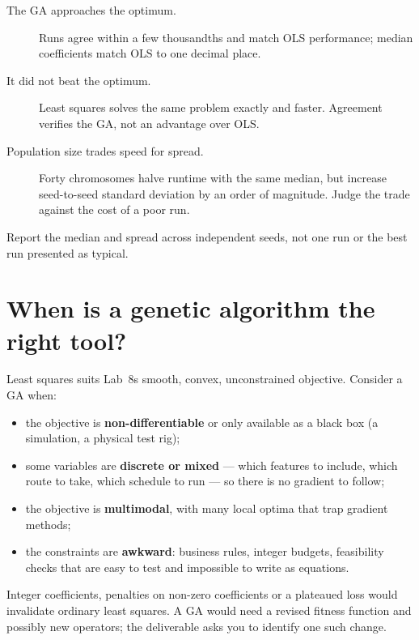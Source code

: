 \begin{description}
  \item[The GA approaches the optimum.] Runs agree within a few thousandths and match OLS performance; median coefficients match OLS to one decimal place.
  \item[It did not beat the optimum.] Least squares solves the same problem exactly and faster. Agreement verifies the GA, not an advantage over OLS.
  \item[Population size trades speed for spread.] Forty chromosomes halve runtime with the same median, but increase seed-to-seed standard deviation by an order of magnitude. Judge the trade against the cost of a poor run.
\end{description}

\begin{pitfall}
Report the median and spread across independent seeds, not one run or the best run presented as typical.
\end{pitfall}

\section{When is a genetic algorithm the right tool?}

Least squares suits Lab~8\textquotesingle s smooth, convex, unconstrained objective. Consider a GA when:

\begin{itemize}
  \item the objective is \textbf{non-differentiable} or only available as a black box (a simulation, a physical test rig);
  \item some variables are \textbf{discrete or mixed} --- which features to include, which route to take, which schedule to run --- so there is no gradient to follow;
  \item the objective is \textbf{multimodal}, with many local optima that trap gradient methods;
  \item the constraints are \textbf{awkward}: business rules, integer budgets, feasibility checks that are easy to test and impossible to write as equations.
\end{itemize}

Integer coefficients, penalties on non-zero coefficients or a plateaued loss would invalidate ordinary least squares. A GA would need a revised fitness function and possibly new operators; the deliverable asks you to identify one such change.

